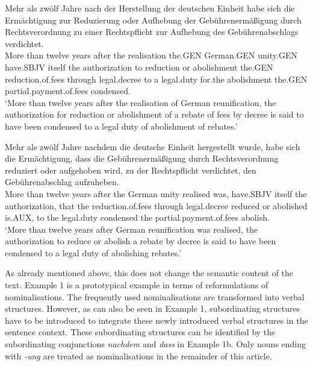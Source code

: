 \documentclass[output=paper]{langsci/langscibook}
\begin{document}
\ea
\gll Mehr als zwölf Jahre nach der Herstellung der deutschen Einheit habe sich die Ermächtigung zur Reduzierung oder Aufhebung der Gebührenermäßigung durch Rechtsverordnung zu einer Rechtspflicht zur Aufhebung des Gebührenabschlags verdichtet. \\
More than twelve years after the realisation the.GEN German.GEN unity.GEN have.SBJV itself the authorization to reduction or abolishment the.GEN reduction.of.fees through legal.decree to a legal.duty for.the abolishment the.GEN partial.payment.of.fees condensed.\\
\glt `More than twelve years after the realisation of German reunification, the authorization for reduction or abolishment of a rebate of fees by decree is said to have been condensed to a legal duty of abolishment of rebates.'
\z

\ea
\gll Mehr als zwölf Jahre nachdem die deutsche Einheit hergestellt wurde, habe sich die Ermächtigung, dass die Gebührenermäßigung durch Rechtsverordnung reduziert oder aufgehoben wird, zu der Rechtspflicht verdichtet, den Gebührenabschlag aufzuheben. \\
More than twelve years after the German unity realised was, have.SBJV itself the authorization, that the reduction.of.fees through legal.decree reduced or abolished is.AUX, to the legal.duty condensed the partial.payment.of.fees abolish.\\
\glt `More than twelve years after German reunification was realised, the authorization to reduce or abolish a rebate by decree is said to have been condensed to a legal duty of abolishing rebates.'
\z

As already mentioned above, this does not change the semantic content of the text. Example 1 is a prototypical example in terms of reformulations of nominalisations. The frequently used nominalisations are transformed into verbal structures. However, as can also be seen in Example 1, subordinating structures have to be introduced to integrate these newly introduced verbal structures in the sentence context. These subordinating structures can be identified by the subordinating conjunctions \textit{nachdem} and \textit{dass} in Example 1b. Only nouns ending with \textit{-ung} are treated as nominalisations in the remainder of this article.
\end{document}
